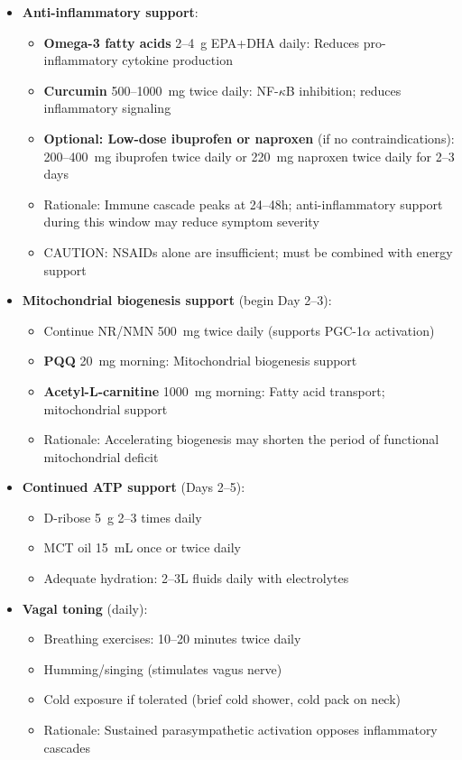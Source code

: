\begin{itemize}
    \item \textbf{Anti-inflammatory support}:
    \begin{itemize}
        \item \textbf{Omega-3 fatty acids} 2--4~g EPA+DHA daily: Reduces pro-inflammatory cytokine production
        \item \textbf{Curcumin} 500--1000~mg twice daily: NF-$\kappa$B inhibition; reduces inflammatory signaling
        \item \textbf{Optional: Low-dose ibuprofen or naproxen} (if no contraindications): 200--400~mg ibuprofen twice daily or 220~mg naproxen twice daily for 2--3 days
        \item Rationale: Immune cascade peaks at 24--48h; anti-inflammatory support during this window may reduce symptom severity
        \item CAUTION: NSAIDs alone are insufficient; must be combined with energy support
    \end{itemize}

    \item \textbf{Mitochondrial biogenesis support} (begin Day 2--3):
    \begin{itemize}
        \item Continue NR/NMN 500~mg twice daily (supports PGC-1$\alpha$ activation)
        \item \textbf{PQQ} 20~mg morning: Mitochondrial biogenesis support
        \item \textbf{Acetyl-L-carnitine} 1000~mg morning: Fatty acid transport; mitochondrial support
        \item Rationale: Accelerating biogenesis may shorten the period of functional mitochondrial deficit
    \end{itemize}

    \item \textbf{Continued ATP support} (Days 2--5):
    \begin{itemize}
        \item D-ribose 5~g 2--3 times daily
        \item MCT oil 15~mL once or twice daily
        \item Adequate hydration: 2--3L fluids daily with electrolytes
    \end{itemize}

    \item \textbf{Vagal toning} (daily):
    \begin{itemize}
        \item Breathing exercises: 10--20 minutes twice daily
        \item Humming/singing (stimulates vagus nerve)
        \item Cold exposure if tolerated (brief cold shower, cold pack on neck)
        \item Rationale: Sustained parasympathetic activation opposes inflammatory cascades
    \end{itemize}


\end{itemize}
